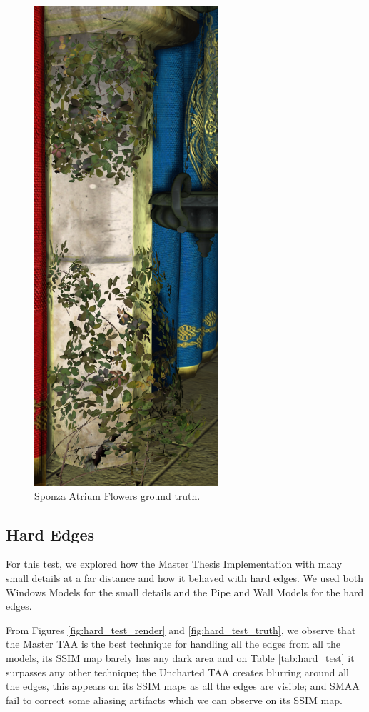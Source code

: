 \documentclass{cslthse-msc}
\begin{document}
\begin{figure}[H]
	\centering
	\includegraphics[scale=0.2]{images/results/sponza_flowers_sobel_ground_truth.png}
	\caption{Sponza Atrium Flowers ground truth.}\label{fig:sponza_flowers_truth}
\end{figure}

\subsection{Hard Edges}
For this test, we explored how the Master Thesis Implementation with many small details at a far distance and how it behaved with hard edges. We used both Windows Models for the small details and the Pipe and Wall Models for the hard edges. 

From Figures \ref{fig:hard_test_render} and \ref{fig:hard_test_truth}, we observe that the Master TAA is the best technique for handling all the edges from all the models, its SSIM map barely has any dark area and on Table \ref{tab:hard_test} it surpasses any other technique; the Uncharted TAA creates blurring around all the edges, this appears on its SSIM maps as all the edges are visible; and SMAA fail to correct some aliasing artifacts which we can observe on its SSIM map.
\end{document}
